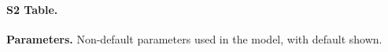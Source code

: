 \documentclass[10pt,letterpaper]{article}
\begin{document}
\paragraph*{S2 Table.}
\label{S2_Table}
{\bf Parameters.}  Non-default parameters used in the model, with default shown.


\nolinenumbers




\end{document}
